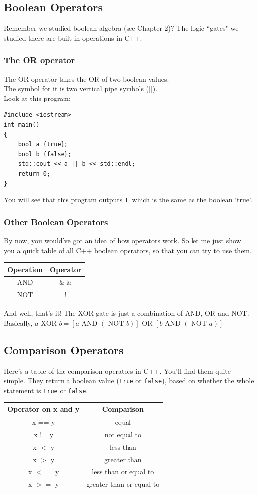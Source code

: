 \documentclass[letterpaper, 12pt]{book}
\begin{document}
\subsection{Boolean Operators}
Remember we studied boolean algebra (see Chapter 2)? The logic ``gates" we studied there are built-in operations in C++.
\subsubsection{The OR operator}
The OR operator takes the OR of two boolean values.\\
The symbol for it is two vertical pipe symbols ($||$).\\
Look at this program:
\begin{lstlisting}
#include <iostream>
int main()
{
	bool a {true};
	bool b {false};
	std::cout << a || b << std::endl;
	return 0;
}
\end{lstlisting}
You will see that this program outputs 1, which is the same as the boolean `true'.
\subsubsection{Other Boolean Operators}
By now, you would've got an idea of how operators work. So let me just show you a quick table of all C++ boolean operators, so that you can try to use them.
\begin{center}
	\begin{tabular}{ |c|c| } 
		\hline
		Operation & Operator\\
		\hline
		AND & \& \& \\ 
		NOT & $!$ \\
		\hline
	\end{tabular}
\end{center}
And well, that's it! The XOR gate is just a combination of AND, OR and NOT.\\
Basically, $a \text{ XOR } b = [a \text{ AND } (\text{ NOT } b )] \text{ OR } [b \text{ AND } (\text{ NOT } a )]$\\
\subsection{Comparison Operators}
Here's a table of the comparison operators in C++. You'll find them quite simple. They return a boolean value (\lstinline{true} or \lstinline{false}), based on whether the whole statement is \lstinline{true} or \lstinline{false}.
\begin{center}
	\begin{tabular}{ |c|c| } 
		\hline
		Operator on x and y & Comparison\\
		\hline
		x == y & equal\\
		x != y & not equal to\\
		x $<$ y  & less than\\
		x $>$ y  & greater than\\
		x $<=$ y & less than or equal to\\
		x $>=$ y & greater than or equal to\\
		\hline
	\end{tabular}
\end{center}
\end{document}

